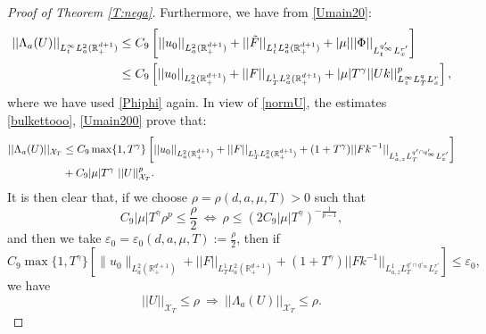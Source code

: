 \documentclass[11pt,letter]{amsart}
\def \RN {\mathbb{R}_+^{d+1}}
\numberwithin{equation}{section}
\newcommand{\ve}{\varepsilon}
\newcommand{\XT}{\mathcal{X}_T}
\numberwithin{equation}{section}
\begin{document}
\begin{proof}[Proof of Theorem \ref{T:nega}]
Furthermore, we have from \eqref{Umain20}:
\begin{align}\label{Umain200}
||\Lambda_a(U)||_{L^\infty_t L^2_a(\RN)} & \le C_9 \left[||u_0||_{L^2_a(\RN)} + ||\tilde F||_{L^1_t L^2_{a}(\RN)} + |\mu| ||\Phi||_{L^{q'_\infty}_t L^{r'}_x} \right]
\\
& \le C_9 \left[||u_0||_{L^2_a(\RN)} + ||F||_{L^1_T L^2_{a}(\RN)} + |\mu| T^{\gamma}  ||U k||_{L^\infty_z L^q_T L^r_x }^p\right],
\notag
\end{align}
where we have used \eqref{Phiphi} again. In view of \eqref{normU}, the estimates  \eqref{bulkettooo}, \eqref{Umain200} prove that:
\begin{align}\label{ball}
||\Lambda_a(U)||_{\XT} & \le C_9 \max\{1,T^{\gamma}\}\left[||u_0||_{L^2_a(\RN)} + ||F||_{L^1_T L^2_a(\RN)} + (1+T^{\gamma}) ||F k^{-1}||_{L^1_{a,z} L^{q'\cap q'_\infty}_T L^{r'}_x }\right]
\\
& + C_9 |\mu| T^{\gamma}\  ||U||_{\XT}^p.
\notag
\end{align}
It is then clear that, if we choose $\rho = \rho(d,a,\mu,T)>0$ such that 
\[
C_9 |\mu| T^{\gamma}  \rho^p\le \frac{\rho}2\ \Longleftrightarrow\ \rho\le \left(2 C_9|\mu|T^{\gamma}\right)^{-\frac{1}{p-1}}, 
\]
and then we take $\ve_0=\ve_0(d,a,\mu,T) := \frac{\rho}2$, then if 
\[
 C_9 \max\{1,T^{\gamma}\} \left[\|u_0\|_{L^2_a(\RN)} + ||F||_{L^1_T L^2_a(\RN)} + (1+T^{\gamma}) ||F k^{-1}||_{L^1_{a,z} L^{q'\cap q'_\infty}_T L^{r'}_x }\right]\le \varepsilon_0,
\]
we have
\[
||U||_{\XT} \le \rho\ \Longrightarrow\ ||\Lambda_a(U)||_{\XT} \le \rho.
\]


\end{proof}
\end{document}

